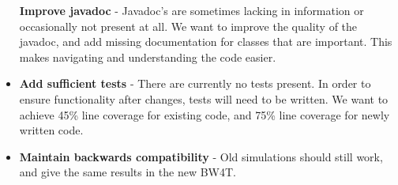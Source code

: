 \begin{itemize}
  \textbf{Improve \gls{javadoc}} - Javadoc's are sometimes lacking in information or
  occasionally not present at all. We want to improve the quality of the javadoc, and add missing documentation for classes that are important. This makes navigating and understanding the code easier. 
   \item
  \textbf{Add sufficient tests} - There are currently no tests present. In order to ensure functionality after changes, tests will need to be written. We want to achieve 45\% line coverage for existing code, and 75\% line coverage for newly written code. 
  \item
  \textbf{Maintain backwards compatibility} - Old simulations should still work, and give the same results in the new BW4T. 
\end{itemize}

